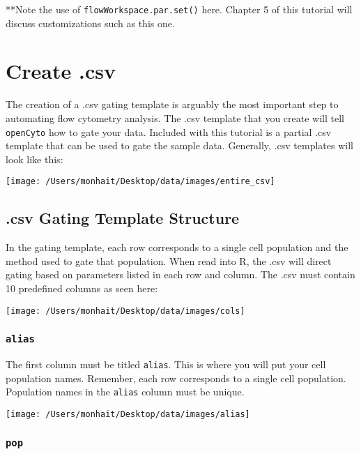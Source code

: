 \documentclass[]{book}
\begin{document}
**Note the use of \texttt{flowWorkspace.par.set()} here. Chapter 5 of this tutorial will discuss customizations such as this one.

\hypertarget{create-.csv}{%
\chapter{Create .csv}\label{create-.csv}}

The creation of a .csv gating template is arguably the most important step to automating flow cytometry analysis. The .csv template that you create will tell \texttt{openCyto} how to gate your data. Included with this tutorial is a partial .csv template that can be used to gate the sample data. Generally, .csv templates will look like this:

\texttt{[image: /Users/monhait/Desktop/data/images/entire\_csv]}

\hypertarget{csv-gating-template-structure}{%
\section{.csv Gating Template Structure}\label{csv-gating-template-structure}}

In the gating template, each row corresponds to a single cell population and the method used to gate that population. When read into R, the .csv will direct gating based on parameters listed in each row and column. The .csv must contain 10 predefined columns as seen here:

\texttt{[image: /Users/monhait/Desktop/data/images/cols]}

\hypertarget{alias}{%
\subsection{\texorpdfstring{\texttt{alias}}{alias}}\label{alias}}

The first column must be titled \texttt{alias}. This is where you will put your cell population names. Remember, each row corresponds to a single cell population. Population names in the \texttt{alias} column must be unique.

\texttt{[image: /Users/monhait/Desktop/data/images/alias]}

\hypertarget{pop}{%
\subsection{\texorpdfstring{\texttt{pop}}{pop}}\label{pop}}
\end{document}
